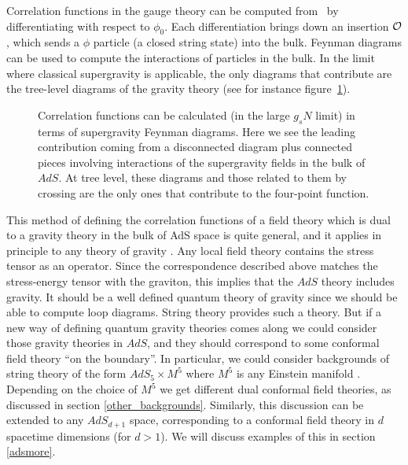 Correlation functions in the gauge theory can be computed from \genera\ by
differentiating with respect to $\phi_0$.  Each differentiation brings down
an insertion ${\cal O}$, which sends a $\phi$ particle (a closed string
state) into the bulk.  Feynman diagrams can be used to compute the
interactions of particles in the bulk.  In the limit where classical
supergravity is applicable, the only diagrams that contribute are the
tree-level diagrams of the gravity theory (see for instance
figure~\ref{dia}).

\begin{figure}[htb]
\begin{center}
\epsfxsize=3.5in\leavevmode{}
\end{center}
\caption{
 Correlation functions can be calculated (in the large $g_s N$ limit) in
terms of supergravity Feynman diagrams. Here we see the leading
contribution coming from a disconnected diagram plus connected pieces
involving interactions of the supergravity fields in the bulk of $AdS$.  At
tree level, these diagrams and those related to them by crossing are the
only ones that contribute to the four-point function.
}
\label{dia}
\end{figure} 



This method of defining the correlation functions of a field theory
which is dual to a gravity theory in the bulk of AdS space is quite
general, and it applies in principle to any theory of gravity
\cite{Witten:1998qj}.  Any local field theory contains the stress
tensor as an operator. Since the correspondence described above
matches the stress-energy tensor with the graviton, this implies that
the $AdS$ theory includes gravity.  It should be a well defined
quantum theory of gravity since we should be able to compute loop
diagrams.  String theory provides such a theory. But if a new way of
defining quantum gravity theories comes along we could consider those
gravity theories in $AdS$, and they should correspond to some
conformal field theory ``on the boundary''.  In particular, we could
consider backgrounds of string theory of the form $AdS_5 \times M^5$
where $M^5$ is any Einstein manifold
\cite{Kehagias:1998gn,Gubser:1999vd,Romans:1985an}.  Depending on the
choice of $M^5$ we get different dual conformal field theories,
as discussed in section \ref{other_backgrounds}.  Similarly,
this discussion can be extended to any $AdS_{d+1}$ space,
corresponding to a conformal field theory in $d$ spacetime dimensions
(for $d>1$). We will discuss examples of this in section \ref{adsmore}.




